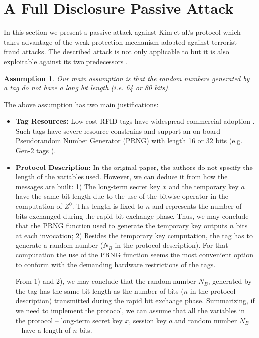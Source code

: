 \documentclass{article}
\newtheorem{assumption}{Assumption}
\begin{document}
\section{A Full Disclosure Passive Attack} \label{sec::secattack}

In this section we present a passive attack against Kim et al.'s \cite{KimAKSP-2008-icisc} protocol which takes advantage of the weak protection mechanism adopted against terrorist fraud attacks. The described attack is not only applicable to \cite{KimAKSP-2008-icisc}  but it is also exploitable against its two predecessors \cite{TuP-2007-rfidtechnology,reid2007}.\\

\begin{assumption}
Our main assumption is that the random numbers generated by a tag do not have a long bit length (i.e. 64 or 80 bits). \\
\end{assumption}

The above assumption has two main justifications:

\begin{itemize}
  \item \textbf{Tag Resources:} Low-cost RFID tags have widespread commercial adoption \cite{Bevan2007}. Such tags have severe resource constrains and support an on-board Pseudorandom Number Generator (PRNG) with length 16 or 32 bits (e.g. Gen-2 tags \cite{EPCC1G2-2008}).
  \item \textbf{Protocol Description:} In the original paper, the authors do not specify the length of the variables used. However, we can deduce it from how the messages are built: 1) The long-term secret key $x$ and the temporary key $a$ have the same bit length due to the use of the bitwise operator in the computation of $Z^{0}$. This length is fixed to $n$ and represents the number of bits exchanged during the rapid bit exchange phase. Thus, we may conclude that the PRNG function used to generate the temporary key outputs $n$ bits at each invocation; 2) Besides the temporary key computation, the tag has to generate a random number ($N_B$ in the protocol description). For that computation the use of the PRNG function seems the most convenient option to conform with the demanding hardware restrictions of the tags.

      From 1) and 2), we may conclude that the random number $N_B$, generated by the tag has the same bit length as the number of bits ($n$ in the protocol description) transmitted during the rapid bit exchange phase.  Summarizing,  if we need to implement the protocol, we can assume that all the variables in the protocol -- long-term secret key $x$, session key $a$ and random number $N_B$ -- have a length of $n$ bits.

\end{itemize}
\end{document}
